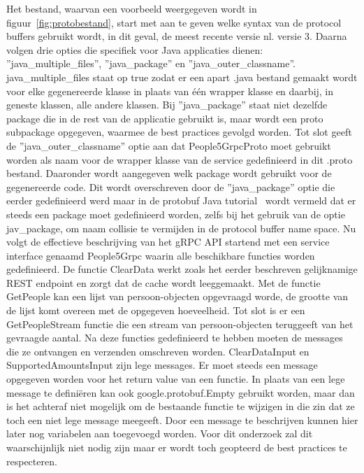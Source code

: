 Het bestand, waarvan een voorbeeld weergegeven wordt in figuur~\ref{fig:protobestand}, start met aan te geven welke syntax van de protocol buffers gebruikt wordt, in dit geval, de meest recente versie nl. versie 3.
Daarna volgen drie opties die specifiek voor Java applicaties dienen: ''java\_multiple\_files'', ''java\_package'' en ''java\_outer\_classname''.
java\_multiple\_files staat op true zodat er een apart .java bestand gemaakt wordt voor elke gegenereerde klasse in plaats
van één wrapper klasse en daarbij, in geneste klassen, alle andere klassen. Bij ''java\_package'' staat niet dezelfde package die in de rest van de applicatie gebruikt is,
maar wordt een proto subpackage opgegeven, waarmee de best practices gevolgd worden.
Tot slot geeft de ''java\_outer\_classname'' optie aan dat People5GrpcProto moet gebruikt worden als naam voor de wrapper klasse van de service gedefinieerd in dit .proto bestand.
Daaronder wordt aangegeven welk package wordt gebruikt voor de gegenereerde code. Dit wordt overschreven door de ''java\_package'' optie die eerder gedefinieerd werd maar
in de protobuf Java tutorial~\parencite{protobufJava} wordt vermeld dat er steeds een package moet gedefinieerd worden, zelfs bij het gebruik van de optie jav\_package, om naam collisie
te vermijden in de protocol buffer name space.\newline
Nu volgt de effectieve beschrijving van het gRPC API startend met een service interface genaamd People5Grpc waarin
alle beschikbare functies worden gedefinieerd. De functie ClearData werkt zoals het eerder beschreven gelijknamige REST endpoint en zorgt dat de cache wordt leeggemaakt.
Met de functie GetPeople kan een lijst van persoon-objecten opgevraagd worde, de grootte van de lijst komt overeen met de opgegeven hoeveelheid.
Tot slot is er een GetPeopleStream functie die een stream van persoon-objecten teruggeeft van het gevraagde aantal.\newline
Na deze functies gedefinieerd te hebben moeten de messages die ze ontvangen en verzenden omschreven worden.
ClearDataInput en SupportedAmountsInput zijn lege messages. Er moet steeds een message opgegeven worden voor het return value van een functie.
In plaats van een lege message te defini\"eren kan ook google.protobuf.Empty gebruikt worden, maar dan is het achteraf niet mogelijk om de bestaande functie
te wijzigen in die zin dat ze toch een niet lege message meegeeft. Door een message te beschrijven kunnen hier later nog variabelen aan toegevoegd worden.
Voor dit onderzoek zal dit waarschijnlijk niet nodig zijn maar er wordt toch geopteerd de best practices te respecteren.
